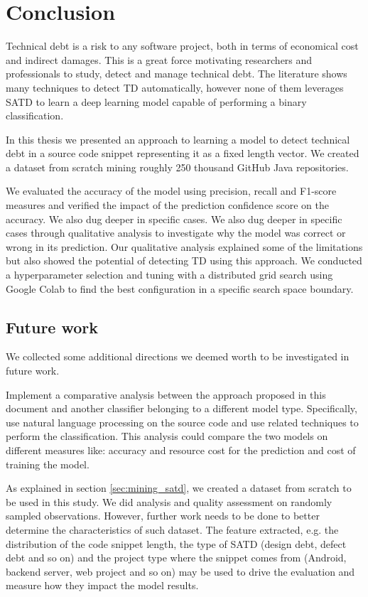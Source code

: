 \chapter{Conclusion}

Technical debt is a risk to any software project, both in terms of economical cost and indirect damages. This is a great force motivating researchers and professionals to study, detect and manage technical debt. 
The literature shows many techniques to detect TD automatically, however none of them leverages SATD to learn a deep learning model capable of performing a binary classification.

In this thesis we presented an approach to learning a model to detect technical debt in a source code snippet representing it as a fixed length vector.
We created a dataset from scratch mining roughly 250 thousand GitHub Java repositories. 

We evaluated the accuracy of the model using precision, recall and F1-score measures and verified the impact of the prediction confidence score on the accuracy. We also dug deeper in specific cases. We also dug deeper in specific cases through qualitative analysis to investigate why the model was correct or wrong in its prediction. Our qualitative analysis explained some of the limitations but also showed the potential of detecting TD using this approach.
We conducted a hyperparameter selection and tuning with a distributed grid search using Google Colab to find the best configuration in a specific search space boundary.

\section{Future work}

We collected some additional directions we deemed worth to be investigated in future work.

Implement a comparative analysis between the approach proposed in this document and another classifier belonging to a different model type. Specifically, use natural language processing on the source code and use related techniques to perform the classification. This analysis could compare the two models on different measures like: accuracy and resource cost for the prediction and cost of training the model.

As explained in section \ref{sec:mining_satd}, we created a dataset from scratch to be used in this study. We did analysis and quality assessment on randomly sampled observations. However, further work needs to be done to better determine the characteristics of such dataset. The feature extracted, e.g. the distribution of the code snippet length, the type of SATD (design debt, defect debt and so on) and the project type where the snippet comes from (Android, backend server, web project and so on) may be used to drive the evaluation and measure how they impact the model results.

